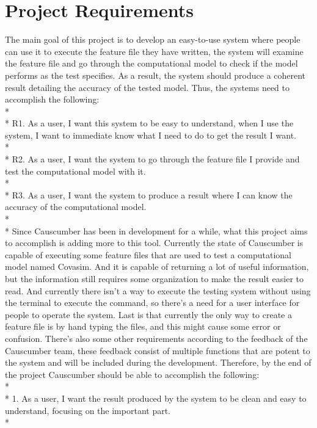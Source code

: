 \section{Project Requirements}

The main goal of this project is to develop an easy-to-use system where people can use it to execute the feature file they have written, the system will examine the feature file and go through the computational model to check if the model performs as the test specifies. As a result, the system should produce a coherent result detailing the accuracy of the tested model. Thus, the systems need to accomplish the following:\\*
\\*
R1. As a user, I want this system to be easy to understand, when I use the system, I want to immediate know what I need to do to get the result I want.\\*
\\*
R2. As a user, I want the system to go through the feature file I provide and test the computational model with it.\\*
\\*
R3. As a user, I want the system to produce a result where I can know the accuracy of the computational model.\\*
\\*
Since Causcumber has been in development for a while, what this project aims to accomplish is adding more to this tool. Currently the state of Causcumber is capable of executing some feature files that are used to test a computational model named Covasim. And it is capable of returning a lot of useful information, but the information still requires some organization to make the result easier to read. And currently there isn’t a way to execute the testing system without using the terminal to execute the command, so there’s a need for a user interface for people to operate the system. Last is that currently the only way to create a feature file is by hand typing the files, and this might cause some error or confusion. There’s also some other requirements according to the feedback of the Causcumber team, these feedback consist of multiple functions that are potent to the system and will be included during the development. Therefore, by the end of the project Causcumber should be able to accomplish the following:\\*
\\*
1.	As a user, I want the result produced by the system to be clean and easy to understand, focusing on the important part.\\*
